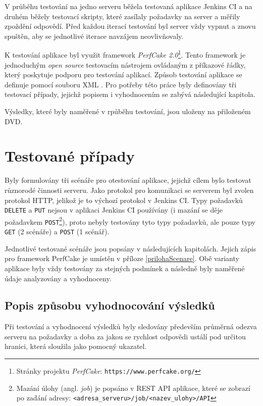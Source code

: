         V průběhu testování na jedno serveru běžela testovaná aplikace Jenkins CI a na druhém běžely testovací
        skripty, které zasílaly požadavky na server a měřily zpoždění odpovědí.
        Před každou iterací testování byl server vždy vypnut a znovu spuštěn, aby se jednotlivé
        iterace navzájem neovlivňovaly.
        \medskip

        K testování aplikace byl využit framework \emph{PerfCake 2.0}\footnote{Stránky projektu \emph{PerfCake}: 
        \texttt{https://www.perfcake.org/}}. Tento framework je jednoduchým \emph{open source} testovacím nástrojem
        ovládaným z příkazové řádky, 
        který poskytuje podporu pro testování aplikací. Způsob testování aplikace se definuje pomocí
        souboru XML \cite{perfcake}.
        Pro potřeby této práce byly definovány tři testovací případy, jejichž popisem i vyhodnocením se 
        zabývá následující kapitola. 

        Výsledky, které byly naměřené v rpůběhu testování, jsou uloženy na přiloženém DVD.
             
        

    \section{Testované případy} \label{testovanePripady}
        Byly formulovány tři scénáře pro otestování aplikace, jejichž cílem bylo testovat různorodé
        činnosti serveru.        
        Jako protokol pro komunikaci
        se serverem byl zvolen protokol HTTP, jelikož je to výchozí protokol v Jenkins CI.
        Typy požadavků \texttt{DELETE} a \texttt{PUT} nejsou v aplikaci Jenkins CI používány (i mazání
        se děje požadavkem \texttt{POST}\footnote{Mazání úlohy (angl. \emph{job}) je popsáno v REST API aplikace,
        které se zobrazí po zadání adresy: \texttt{<adresa\_serveru>/job/<nazev\_ulohy>/API}}), 
        proto nebyly testovány tyto typy požadavků, ale pouze typy \texttt{GET} (2 scénáře) a \texttt{POST} (1 scénář). 

        Jednotlivé testované scénáře jsou popsány v následujících kapitolách. Jejich zápis
        pro framework PerfCake je umístěn v příloze \ref{prilohaScenare}.
        Obě varianty aplikace byly vždy testovány za stejných podmínek a následně byly naměřené údaje analyzovány
        a vyhodnoceny.

        \subsection{Popis způsobu vyhodnocování výsledků} \label{zpusobVyhodnoceniVysledku}
            Při testování a vyhodnocení výsledků byly sledovány především průměrná odezva serveru na požadavky a
            doba za jakou se rychlost odpovědi ustálí pod určitou hranici, 
            která sloužila jako pomocný ukazatel.
            
